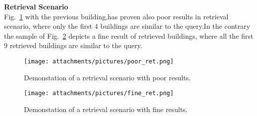 \textbf{\large{Retrieval Scenario}}\\
Fig.~\ref{fig:poor_ret} with the previous building,has proven also poor results in retrieval scenario,
where only the first 4 buildings are similar to the query.In the contrary the sample of Fig.~\ref{fig:fine_ret} depicts a fine result of retrieved buildings, where all the first 9 retrieved buildings are similar to the query.

\begin{figure}[H]
  \centering
  \texttt{[image: attachments/pictures/poor\_ret.png]}
  \caption{Demonstation of a retrieval scenario with poor results.}
  \label{fig:poor_ret}
\end{figure}
\begin{figure}[ht!]
  \centering
  \texttt{[image: attachments/pictures/fine\_ret.png]}
  \caption{Demonstation of a retrieval scenario with fine results.}
  \label{fig:fine_ret}
\end{figure} 
